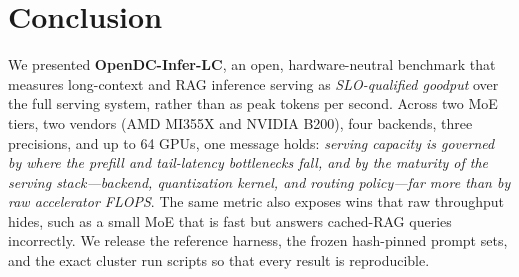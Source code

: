\section{Conclusion}
\label{sec:conclusion}

We presented \textbf{OpenDC-Infer-LC}, an open, hardware-neutral benchmark that
measures long-context and RAG inference serving as \emph{SLO-qualified goodput}
over the full serving system, rather than as peak tokens per second. Across two MoE
tiers, two vendors (AMD MI355X and NVIDIA B200), four backends, three precisions,
and up to 64 GPUs, one message holds: \emph{serving capacity is governed by where
the prefill and tail-latency bottlenecks fall, and by the maturity of the serving
stack---backend, quantization kernel, and routing policy---far more than by raw
accelerator FLOPS}. The same metric also exposes wins that raw throughput hides,
such as a small MoE that is fast but answers cached-RAG queries incorrectly. We
release the reference harness, the frozen hash-pinned prompt sets, and the exact
cluster run scripts so that every result is reproducible.
